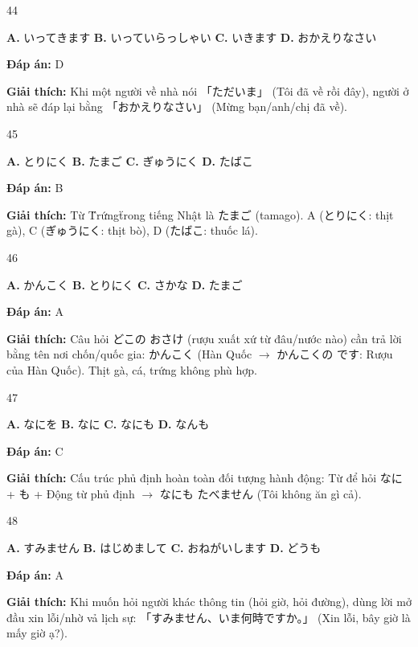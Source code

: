 \documentclass[12pt,a4paper]{report}
\newcommand{\source}[1]{}
\newcommand{\choice}[2]{\textbf{#1.} #2 \quad}
\newcommand{\answer}[1]{\par\textbf{Đáp án:} #1}
\newcommand{\confidence}[1]{}
\newcommand{\explain}[1]{\par\textbf{Giải thích:} #1\vspace{0.5cm}}
\begin{document}
\begin{question}{44}
\source{Q16.webp}
\choice{A}{いってきます}
\choice{B}{いっていらっしゃい}
\choice{C}{いきます}
\choice{D}{おかえりなさい}
\answer{D}
\confidence{high}
\explain{Khi một người về nhà nói 「ただいま」 (Tôi đã về rồi đây), người ở nhà sẽ đáp lại bằng 「おかえりなさい」 (Mừng bạn/anh/chị đã về).}
\end{question}

\begin{question}{45}
\source{Q27.webp}
\choice{A}{とりにく}
\choice{B}{たまご}
\choice{C}{ぎゅうにく}
\choice{D}{たばこ}
\answer{B}
\confidence{high}
\explain{Từ \"Trứng\" trong tiếng Nhật là たまご (tamago). A (とりにく: thịt gà), C (ぎゅうにく: thịt bò), D (たばこ: thuốc lá).}
\end{question}

\begin{question}{46}
\source{Q8.webp}
\choice{A}{かんこく}
\choice{B}{とりにく}
\choice{C}{さかな}
\choice{D}{たまご}
\answer{A}
\confidence{high}
\explain{Câu hỏi どこの おさけ (rượu xuất xứ từ đâu/nước nào) cần trả lời bằng tên nơi chốn/quốc gia: かんこく (Hàn Quốc $\rightarrow$ かんこくの です: Rượu của Hàn Quốc). Thịt gà, cá, trứng không phù hợp.}
\end{question}

\begin{question}{47}
\source{Q9.webp}
\choice{A}{なにを}
\choice{B}{なに}
\choice{C}{なにも}
\choice{D}{なんも}
\answer{C}
\confidence{high}
\explain{Cấu trúc phủ định hoàn toàn đối tượng hành động: Từ để hỏi なに + も + Động từ phủ định $\rightarrow$ なにも たべません (Tôi không ăn gì cả).}
\end{question}

\begin{question}{48}
\source{Q12.webp}
\choice{A}{すみません}
\choice{B}{はじめまして}
\choice{C}{おねがいします}
\choice{D}{どうも}
\answer{A}
\confidence{high}
\explain{Khi muốn hỏi người khác thông tin (hỏi giờ, hỏi đường), dùng lời mở đầu xin lỗi/nhờ vả lịch sự: 「すみません、いま何時ですか。」 (Xin lỗi, bây giờ là mấy giờ ạ?).}
\end{question}
\end{document}
